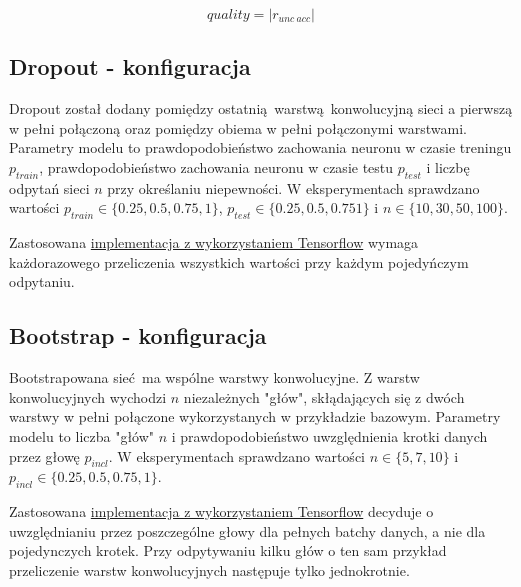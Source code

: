 \[ quality = |r_{unc\ acc}|\]

\subsection{Dropout - konfiguracja}
Dropout został dodany pomiędzy ostatnią warstwą konwolucyjną sieci a pierwszą w pełni połączoną oraz pomiędzy obiema w pełni połączonymi warstwami.
Parametry modelu to prawdopodobieństwo zachowania neuronu w czasie treningu $p_{train}$, prawdopodobieństwo zachowania neuronu w czasie testu $p_{test}$ i liczbę odpytań sieci $n$ przy określaniu niepewności. W eksperymentach sprawdzano wartości $p_{train} \in \{0.25, 0.5, 0.75, 1\}$, $p_{test} \in \{0.25, 0.5, 0.751\}$ i $n \in \{10, 30, 50, 100\}$.

Zastosowana \href{https://link.do.pliku}{implementacja z wykorzystaniem Tensorflow} wymaga każdorazowego przeliczenia wszystkich wartości przy każdym pojedyńczym odpytaniu.

\subsection{Bootstrap - konfiguracja}
Bootstrapowana sieć ma wspólne warstwy konwolucyjne. Z warstw konwolucyjnych wychodzi $n$ niezależnych "głów", skłądających się z dwóch warstwy w pełni połączone wykorzystanych w przykładzie bazowym. Parametry modelu to liczba "głów" $n$ i prawdopodobieństwo uwzględnienia krotki danych przez głowę $p_{incl}$.  W eksperymentach sprawdzano wartości $n \in  \{5,7,10\}$ i $p_{incl}\in\{0.25, 0.5, 0.75, 1\}$.

Zastosowana \href{https://link.do.pliku}{implementacja z wykorzystaniem Tensorflow} decyduje o uwzględnianiu przez poszczególne głowy dla pełnych batchy danych, a nie dla pojedynczych krotek. Przy odpytywaniu kilku głów o ten sam przykład przeliczenie warstw konwolucyjnych następuje tylko jednokrotnie.


